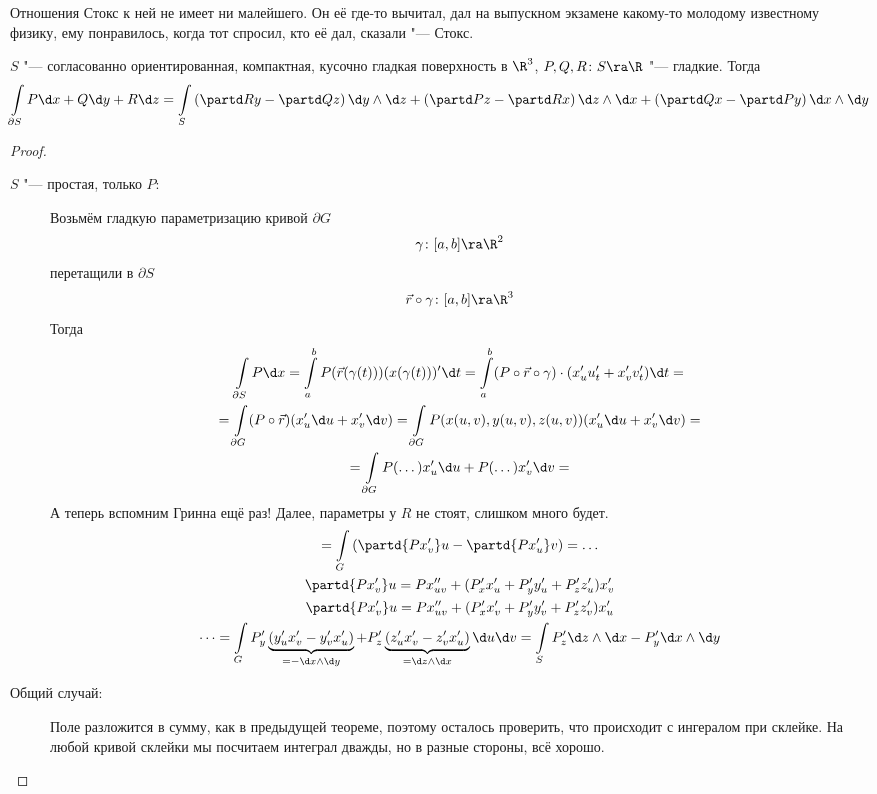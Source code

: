 \begin{theorem}
	\begin{Rem}
		Отношения Стокс к ней не имеет ни малейшего.
		Он её где-то вычитал, дал на выпускном экзамене какому-то молодому известному физику, ему понравилось,
		когда тот спросил, кто её дал, сказали "--- Стокс.
	\end{Rem}
	$S$ "--- согласованно ориентированная, компактная, кусочно гладкая поверхность в $\R^3$,
	$P, Q, R\colon S \ra \R$ "--- гладкие.
	Тогда
	\[
		\int\limits_{\partial S} P \d x + Q \d y + R \d z
		= \int\limits_S \left(\partd Ry - \partd Qz\right) \d y \wedge \d z + \left(\partd Pz - \partd Rx\right) \d z \wedge \d x + \left(\partd Qx - \partd Py\right) \d x \wedge \d y
	\]
\end{theorem}
\begin{proof}\begin{description}
\item[$S$ "--- простая, только $P$:]
	Возьмём гладкую параметризацию кривой $\partial G$
	\[ \gamma \colon [a, b] \ra \R^2 \]
	перетащили в $\partial S$
	\[ \vec r \circ \gamma\colon [a, b] \ra \R^3 \]
	Тогда
	\begin{gather*}
		\int\limits_{\partial S} P \d x
		= \int\limits_a^b P(\vec r(\gamma(t))) (x(\gamma(t)))' \d t
		= \int\limits_a^b (P \circ \vec r \circ \gamma) \cdot (x_u' u_t' + x_v' v_t') \d t = \\
		= \int\limits_{\partial G} (P \circ \vec r) (x_u' \d u + x_v' \d v)
		= \int\limits_{\partial G} P(x(u, v), y(u, v), z(u, v)) (x_u' \d u + x_v' \d v) = \\
		= \int\limits_{\partial G} P(\dots) x_u' \d u + P(\dots) x_v' \d v = 
	\end{gather*}
	А теперь вспомним Гринна ещё раз! Далее, параметры у $R$ не стоят, слишком много будет.
	\begin{gather*}
		= \int\limits_G \left( \partd{P x_v'}u - \partd{P x_u'}v\right) = \dots \\
		\partd{P x_v'}u = P x_{uv}'' + (P_x' x_u' + P_y' y_u' + P_z' z_u') x_v' \\
		\partd{P x_v'}u = P x_{uv}'' + (P_x' x_v' + P_y' y_v' + P_z' z_v') x_u' \\
		\dots
		= \int\limits_G P_y' \underbrace{(y_u' x_v' - y_v' x_u')}_{=-\d x \wedge \d y}
		              + P_z' \underbrace{(z_u' x_v' - z_v' x_u')}_{= \d z \wedge \d x} \d u \d v
		= \int\limits_S P_z' \d z \wedge \d x - P_y' \d x \wedge \d y
	\end{gather*}

\item[Общий случай:]
	Поле разложится в сумму, как в предыдущей теореме, поэтому осталось проверить, что происходит с ингералом при склейке.
	На любой кривой склейки мы посчитаем интеграл дважды, но в разные стороны, всё хорошо.
\end{description}\end{proof}

